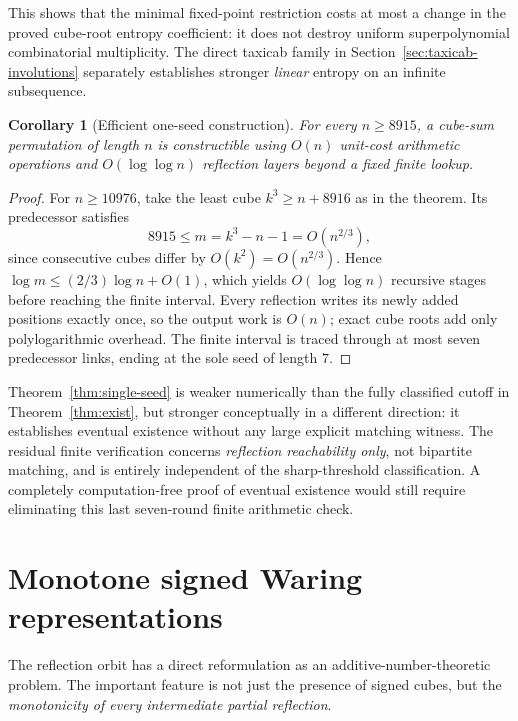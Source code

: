 \documentclass[10pt]{article}
\newtheorem{corollary}{Corollary}
\begin{document}
This shows that the minimal
fixed-point restriction costs
at most a change in the proved
cube-root entropy coefficient:
it does not destroy uniform
superpolynomial combinatorial
multiplicity. The direct
taxicab family in
Section~\ref{sec:taxicab-involutions}
separately establishes stronger
\emph{linear} entropy on
an infinite subsequence.

\begin{corollary}[Efficient one-seed construction]
\label{cor:single-seed-alg}
For every $n\ge8915$, a cube-sum
permutation of length $n$ is
constructible using $O(n)$
unit-cost arithmetic operations
and $O(\log\log n)$ reflection
layers beyond a fixed finite lookup.
\end{corollary}
\begin{proof}
For $n\ge10976$, take the least
cube $k^3\ge n+8916$ as in the
theorem. Its predecessor satisfies
\[
8915\le m=k^3-n-1
=O(n^{2/3}),
\]
since consecutive cubes differ by
$O(k^2)=O(n^{2/3})$.
Hence $\log m\le(2/3)\log n+O(1)$,
which yields $O(\log\log n)$
recursive stages before reaching
the finite interval. Every reflection
writes its newly added positions
exactly once, so the output work
is $O(n)$; exact cube roots add
only polylogarithmic overhead.
The finite interval is traced through
at most seven predecessor links,
ending at the sole seed of length $7$.
\end{proof}

Theorem~\ref{thm:single-seed} is weaker
numerically than the fully classified
cutoff in Theorem~\ref{thm:exist},
but stronger conceptually in a different
direction: it establishes eventual
existence without any large explicit
matching witness. The residual finite
verification concerns \emph{reflection
reachability only}, not bipartite
matching, and is entirely independent
of the sharp-threshold classification.
A completely computation-free proof
of eventual existence would still
require eliminating this last
seven-round finite arithmetic check.

\section{Monotone signed Waring representations}
\label{sec:signed-waring}
The reflection orbit has a direct reformulation
as an additive-number-theoretic problem.
The important feature is not just the
presence of signed cubes, but the
\emph{monotonicity of every intermediate
partial reflection}.
\end{document}
